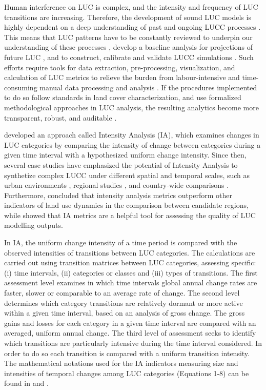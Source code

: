 Human interference on LUC is complex, and the intensity and frequency of
LUC transitions are increasing. Therefore, the development of sound LUC
models is highly dependent on a deep understanding of past and ongoing
LUCC processes \citep{Muller2014}. This means that LUC patterns have to
be constantly reviewed to underpin our understanding of these processes
\citep{Lambin1997, Lambin2006}, develop a baseline analysis for
projections of future LUC \citep{Hurtt2011}, and to construct, calibrate
and validate LUCC simulations \citep{Prestele2016}. Such efforts require
tools for data extraction, pre-processing, visualization, and
calculation of LUC metrics to relieve the burden from labour-intensive
and time-consuming manual data processing and analysis \citep{Yu2019a}.
If the procedures implemented to do so follow standards in land cover
characterization, and use formalized methodological approaches in LUC
analysis, the resulting analytics become more transparent, robust, and
auditable \citep{Herold2006, Muller2014, Yang2017}.

\citet{Aldwaik2012} developed an approach called Intensity Analysis
(IA), which examines changes in LUC categories by comparing the
intensity of change between categories during a given time interval with
a hypothesized uniform change intensity. Since then, several case
studies have emphasized the potential of Intensity Analysis to
synthetize complex LUCC under different spatial and temporal scales,
such as urban environments \citep{Akinyemi2017, Subasinghe2016},
regional studies \citep{Melo2018, Mwangi2017, Souza2017}, and
country-wide comparisons \citep{Chaudhuri2016}. Furthermore,
\citet{Huang2018} concluded that intensity analysis metrics outperform
other indicators of land use dynamics in the comparison between
candidate regions, while \citet{Varga2019} showed that IA metrics are a
helpful tool for assessing the quality of LUC modelling outputs.

In IA, the uniform change intensity of a time period is compared with
the observed intensities of transitions between LUC categories. The
calculations are carried out using transition matrices between LUC
categories, assessing specific: (i) time intervals, (ii) categories or
classes and (iii) types of transitions. The first assessment level
examines in which time intervals global annual change rates are faster,
slower or comparable to an average rate of change. The second level
determines which category transitions are relatively dormant or more
active within a given time interval, based on an analysis of gross
change. The gross gains and losses for each category in a given time
interval are compared with an averaged, uniform annual change. The third
level of assessment seeks to identify which transitions are particularly
intensive during the time interval considered. In order to do so each
transition is compared with a uniform transition intensity. The
mathematical notations used for the IA indicators measuring size and
intensities of temporal changes among LUC categories (Equations 1-8) can
be found in \citet{Aldwaik2012} and \citet{Aldwaik2013}.

